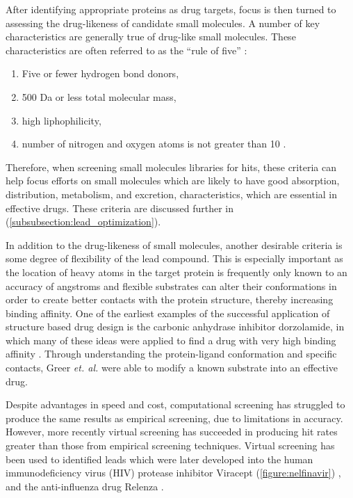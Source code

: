 After identifying appropriate proteins as drug targets, focus is then turned to assessing the drug-likeness of candidate small molecules.
A number of key characteristics are generally true of drug-like small molecules.
These characteristics are often referred to as the ``rule of five'' \cite{lipinski2004lead,hopkins2002druggable}:
\begin{enumerate}
\item Five or fewer hydrogen bond donors,
\item 500 Da or less total molecular mass,
\item high liphophilicity,
\item number of nitrogen and oxygen atoms is not greater than 10 \cite{rule_of_five}.
\end{enumerate}
Therefore, when screening small molecules libraries for hits, these criteria can help focus efforts on small molecules which are likely to have good absorption, distribution, metabolism, and excretion, characteristics, which are essential in effective drugs.
These criteria are discussed further in  (\ref{subsubsection:lead_optimization}).

In addition to the drug-likeness of small molecules, another desirable criteria is some degree of flexibility of the lead compound.
This is especially important as the location of heavy atoms in the target protein is frequently only known to an accuracy of  angstroms and flexible substrates can alter their conformations in order to create better contacts with the protein structure, thereby increasing binding affinity.
One of the earliest examples of the successful application of structure based drug design is the carbonic anhydrase inhibitor dorzolamide, in which many of these ideas were applied to find a drug with very high binding affinity \cite{greer1994application}.
Through understanding the protein-ligand conformation and specific contacts, Greer {\it et. al.} were able to modify a known substrate into an effective drug. 


Despite advantages in speed and cost, computational screening has struggled to produce the same results as empirical screening, due to limitations in accuracy.
However, more recently virtual screening has succeeded in producing hit rates greater than those from empirical screening techniques.
Virtual screening has been used to identified leads which were later developed into the human immunodeficiency virus (HIV) protease inhibitor Viracept (\ref{figure:nelfinavir}) \cite{kaldor1997viracept}, and the anti-influenza drug Relenza \cite{von1993rational}.


